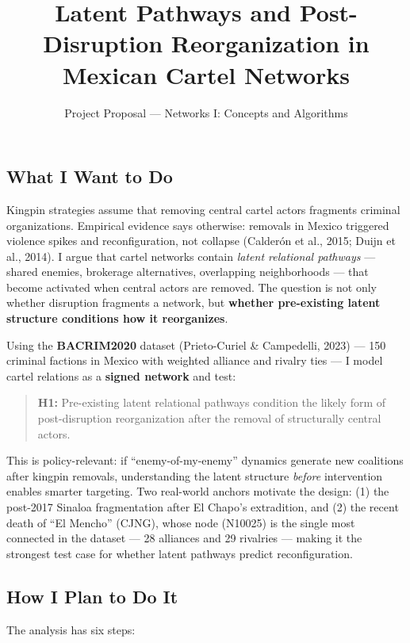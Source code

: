 \documentclass[
  11pt,
]{article}
\title{Latent Pathways and Post-Disruption Reorganization in Mexican
Cartel Networks}
\subtitle{Project Proposal --- Networks I: Concepts and Algorithms}
\author{}
\date{}
\begin{document}
\maketitle


\subsection{What I Want to Do}\label{what-i-want-to-do}

Kingpin strategies assume that removing central cartel actors fragments
criminal organizations. Empirical evidence says otherwise: removals in
Mexico triggered violence spikes and reconfiguration, not collapse
(Calderón et al., 2015; Duijn et al., 2014). I argue that cartel
networks contain \emph{latent relational pathways} --- shared enemies,
brokerage alternatives, overlapping neighborhoods --- that become
activated when central actors are removed. The question is not only
whether disruption fragments a network, but \textbf{whether pre-existing
latent structure conditions how it reorganizes}.

Using the \textbf{BACRIM2020} dataset (Prieto-Curiel \& Campedelli,
2023) --- 150 criminal factions in Mexico with weighted alliance and
rivalry ties --- I model cartel relations as a \textbf{signed network}
and test:

\begin{quote}
\textbf{H1:} Pre-existing latent relational pathways condition the
likely form of post-disruption reorganization after the removal of
structurally central actors.
\end{quote}

This is policy-relevant: if ``enemy-of-my-enemy'' dynamics generate new
coalitions after kingpin removals, understanding the latent structure
\emph{before} intervention enables smarter targeting. Two real-world
anchors motivate the design: (1) the post-2017 Sinaloa fragmentation
after El Chapo's extradition, and (2) the recent death of ``El Mencho''
(CJNG), whose node (N10025) is the single most connected in the dataset
--- 28 alliances and 29 rivalries --- making it the strongest test case
for whether latent pathways predict reconfiguration.

\subsection{How I Plan to Do It}\label{how-i-plan-to-do-it}

The analysis has six steps:
\end{document}
